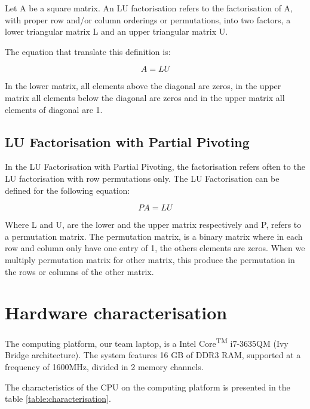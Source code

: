 \documentclass[conference,compsoc]{IEEEtran}
\begin{document}
\begin{displayquote}
Let A be a square matrix. An LU factorisation refers to the factorisation of A, with proper row and/or column orderings or permutations, into two factors, a lower triangular matrix L and an upper triangular matrix U.
\end{displayquote}

The equation that translate this definition is:

\begin{equation}
    A = LU
\end{equation}

In the lower matrix, all elements above the diagonal are zeros, in the upper matrix all elements below the diagonal are zeros and in the upper matrix all elements of diagonal are 1.

\subsection{LU Factorisation with Partial Pivoting}
In the LU Factorisation with Partial Pivoting, the factorisation refers often to the LU factorisation with row permutations only. The LU Factorisation can be defined for the following equation:

\begin{equation}
    PA = LU
\end{equation}

Where L and U, are the lower and the upper matrix respectively and P, refers to a permutation matrix. The permutation matrix, is a binary matrix where in each row and column only have one entry of 1, the others elements are zeros. When we multiply permutation matrix for other matrix, this produce the permutation in the rows or columns of the other matrix. 

\section{Hardware characterisation}

The computing platform, our team laptop, is a  Intel\textsuperscript{\textregistered} Core\textsuperscript{TM} i7-3635QM (Ivy Bridge architecture). The system features 16 GB of DDR3 RAM, supported at a frequency of 1600MHz, divided in 2 memory channels. \par 

The characteristics of the CPU on the computing platform is presented in the table \ref{table:characterisation}.
\end{document}
